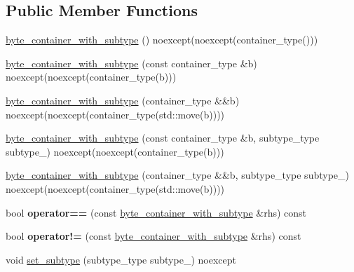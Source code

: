 \subsection*{Public Member Functions}
\begin{DoxyCompactItemize}
\item 
\hyperlink{classnlohmann_1_1byte__container__with__subtype_a89c78caf8c7b54dc1bcfa4b0b23d2fc8}{byte\+\_\+container\+\_\+with\+\_\+subtype} () noexcept(noexcept(container\+\_\+type()))
\item 
\hyperlink{classnlohmann_1_1byte__container__with__subtype_a640b6dd55847e86dbb936f97b946170e}{byte\+\_\+container\+\_\+with\+\_\+subtype} (const container\+\_\+type \&b) noexcept(noexcept(container\+\_\+type(b)))
\item 
\hyperlink{classnlohmann_1_1byte__container__with__subtype_a73dcae1798eab1b496936bfae7b4b9c0}{byte\+\_\+container\+\_\+with\+\_\+subtype} (container\+\_\+type \&\&b) noexcept(noexcept(container\+\_\+type(std\+::move(b))))
\item 
\hyperlink{classnlohmann_1_1byte__container__with__subtype_a3c0a82d77668f384bce05c6ec4537cfe}{byte\+\_\+container\+\_\+with\+\_\+subtype} (const container\+\_\+type \&b, subtype\+\_\+type subtype\+\_\+) noexcept(noexcept(container\+\_\+type(b)))
\item 
\hyperlink{classnlohmann_1_1byte__container__with__subtype_a8c61acfee31216f530d2bd37571a6ff4}{byte\+\_\+container\+\_\+with\+\_\+subtype} (container\+\_\+type \&\&b, subtype\+\_\+type subtype\+\_\+) noexcept(noexcept(container\+\_\+type(std\+::move(b))))
\item 
\mbox{\label{classnlohmann_1_1byte__container__with__subtype_aee67fde9d3d571a07d5bb35df21c0555}} 
bool {\bfseries operator==} (const \hyperlink{classnlohmann_1_1byte__container__with__subtype}{byte\+\_\+container\+\_\+with\+\_\+subtype} \&rhs) const
\item 
\mbox{\label{classnlohmann_1_1byte__container__with__subtype_a760bf39cc5477bc663d8bb3c44aabf6a}} 
bool {\bfseries operator!=} (const \hyperlink{classnlohmann_1_1byte__container__with__subtype}{byte\+\_\+container\+\_\+with\+\_\+subtype} \&rhs) const
\item 
void \hyperlink{classnlohmann_1_1byte__container__with__subtype_aa8f9fca70673949d7483a6097d00d61c}{set\+\_\+subtype} (subtype\+\_\+type subtype\+\_\+) noexcept

\end{DoxyCompactItemize}
